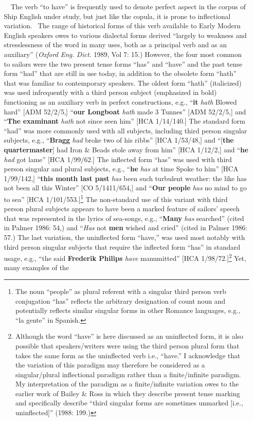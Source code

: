 \documentclass[12pt]{article}
\newenvironment{styleStandard}{\renewcommand\baselinestretch{1.0}\setlength\leftskip{0cm}\setlength\rightskip{0cm plus 1fil}\setlength\parindent{0cm}\setlength\parfillskip{0pt plus 1fil}\setlength\parskip{0in plus 1pt}\writerlistparindent\writerlistleftskip\leavevmode\normalfont\normalsize\writerlistlabel\ignorespaces}{\unskip\vspace{0in plus 1pt}\par}
\newcommand\writerlistleftskip{}
\newcommand\writerlistparindent{}
\newcommand\writerlistlabel{}
\begin{document}
\begin{styleStandard}
\ \ The verb “to have” is frequently used to denote perfect aspect in the corpus of Ship English under study, but just like the copula, it is prone to inflectional variation. \ The range of historical forms of this verb available to Early Modern English speakers owes to various dialectal forms derived “largely to weakness and stresslessness of the word in many uses, both as a principal verb and as an auxiliary” (\textit{Oxford Eng. Dict. }1989, Vol 7: 15.) However, the four most common to sailors were the two present tense forms “has” and “have” and the past tense form “had” that are still in use today, in addition to the obsolete form “hath” that was familiar to contemporary speakers. The oldest form “hath” (italicized) was used infrequently with a third person subject (emphasized in bold) functioning as an auxiliary verb in perfect constructions, e.g., “\textbf{it} \textit{hath }Blowed hard” [ADM 52/2/5,] “\textbf{our Longboat} \textit{hath }made 3 Tunnes” [ADM 52/2/5,] and “\textbf{The examinant} \textit{hath }not since seen him” [HCA 1/14/140.] The standard form “had” was more commonly used with all subjects, including third person singular subjects, e.g., “\textbf{Bragg} \textit{had }broke two of his ribbs” [HCA 1/53/48,] and “[\textbf{the quartermaster}] had Iron \& Beads stole away from him” [HCA 1/12/2,] and “\textbf{he} \textit{had }got lame” [HCA 1/99/62.] The inflected form “has” was used with third person singular and plural subjects, e.g., “\textbf{he} \textit{has} at time Spoke to him” [HCA 1/99/142,] “\textbf{this month last past} \textit{has} been such turbulent weather: the like has not been all this Winter” [CO 5/1411/654,] and “\textbf{Our people} \textit{has} no mind to go to sea” [HCA 1/101/553.]\footnote{ The noun “people” as plural referent with a singular third person verb conjugation “has” reflects the arbitrary designation of count noun and potentially reflects similar singular forms in other Romance languages, e.g., “la gente” in Spanish.} The non-standard use of this variant with third person plural subjects appears to have been a marked feature of sailors’ speech that was represented in the lyrics of sea-songs, e.g., “\textbf{Many} \textit{has} searched” (cited in Palmer 1986: 54,) and “\textit{Has} not \textbf{men} wished and cried” (cited in Palmer 1986: 57.) The last variation, the uninflected form “have,” was used most notably with third person singular subjects that require the inflected form “has” in standard usage, e.g., “the said \textbf{Frederik Philips} \textit{have }manumitted” [HCA 1/98/72.]\footnote{ Although the word “have” is here discussed as an uninflected form, it is also possible that speakers/writers were using the third person plural form that takes the same form as the uninflected verb i.e., “have.” I acknowledge that the variation of this paradigm may therefore be considered as a singular/plural inflectional paradigm rather than a finite/infinite paradigm. My interpretation of the paradigm as a finite/infinite variation owes to the earlier work of Bailey \& Ross in which they describe present tense marking and specifically describe “third singular forms are sometimes unmarked [i.e., uninflected]” (1988: 199.)} Yet, many examples of the 
\end{styleStandard}
\end{document}
